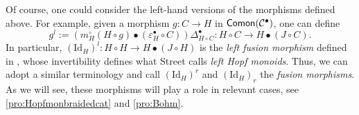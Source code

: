 \documentclass[nosumlimits,twoside]{amsart}
\theoremstyle{definition}
\theoremstyle{remark}
\newcommand{\id}{\mathrm{Id}}
\newcommand{\Cc}{\mathcal{C}}
\def\Comon{{\sf Comon}}
\def\Mon{{\sf Mon}}
\begin{document}
Of course, one could consider the left-hand versions of the morphisms defined above. For example, given a
morphism $g:C\rightarrow H$  in $\Comon(\Cc^\bullet)$, one can define
\begin{equation*}\label{formgr}
g^{l} :=\left( m_{H}^{\circ }\left( H\circ g\right) \bullet \left(
\varepsilon _{H}^{\bullet }\circ C\right) \right) \Delta _{H\circ
C}^{\bullet }:H\circ C\rightarrow H\bullet \left( J\circ C\right).
\end{equation*}
In particular,  $(\id_H)^l:H\circ H\to H\bullet(J\circ H)$ is the \emph{left fusion morphism} defined in \cite[\S 4.7]{Street}, whose invertibility defines what Street calls \emph{left Hopf monoids}. Thus, we can adopt a similar terminology and call $(\id_H)^r$ and $(\id_H)_r$ the \emph{fusion morphisms}. As we will see, these morphisms will play a role in relevant cases, see \cref{pro:Hopfmonbraidedcat} and  \cref{pro:Bohm}.
\end{document}
